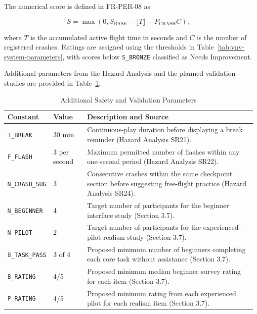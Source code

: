 \documentclass[12pt, titlepage]{article}
\begin{document}
The numerical score is defined in FR-PER-08 as

\[
S = \max(0, S_{\mathrm{BASE}} - \lfloor T \rfloor
    - P_{\mathrm{CRASH}}C),
\]

where $T$ is the accumulated active flight time in seconds and $C$ is the number of registered crashes. Ratings are assigned using the thresholds in Table~\ref{tab:vnv-system-parameters}, with scores below \texttt{S\_BRONZE} classified as Needs Improvement.

Additional parameters from the Hazard Analysis and the planned validation studies are provided in Table~\ref{tab:vnv-additional-parameters}.

\begin{table}[H]
\centering
\caption{Additional Safety and Validation Parameters}
\label{tab:vnv-additional-parameters}
\small
\begin{tabularx}{\textwidth}{@{}l l X@{}}
\toprule
\textbf{Constant} & \textbf{Value} & \textbf{Description and Source} \\
\midrule

\texttt{T\_BREAK} & 30 min &
Continuous-play duration before displaying a break reminder (Hazard Analysis SR21). \\

\texttt{F\_FLASH} & 3 per second &
Maximum permitted number of flashes within any one-second period (Hazard Analysis SR22). \\

\texttt{N\_CRASH\_SUG} & 3 &
Consecutive crashes within the same checkpoint section before suggesting free-flight practice (Hazard Analysis SR24). \\

\texttt{N\_BEGINNER} & 4 &
Target number of participants for the beginner interface study (Section 3.7). \\

\texttt{N\_PILOT} & 2 &
Target number of participants for the experienced-pilot realism study (Section 3.7). \\

\texttt{B\_TASK\_PASS} & 3 of 4 &
Proposed minimum number of beginners completing each core task without assistance (Section 3.7). \\

\texttt{B\_RATING} & 4/5 &
Proposed minimum median beginner survey rating for each item (Section 3.7). \\

\texttt{P\_RATING} & 4/5 &
Proposed minimum rating from each experienced pilot for each realism item (Section 3.7). \\

\bottomrule
\end{tabularx}
\end{table}
\end{document}
